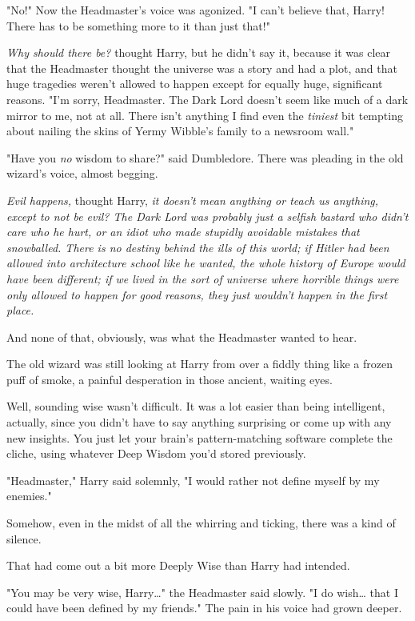 "No!" Now the Headmaster's voice was agonized. "I can't believe that, Harry!
There has to be something more to it than just that!"

\emph{Why should there be?} thought Harry, but he didn't say it, because it was
clear that the Headmaster thought the universe was a story and had a plot, and
that huge tragedies weren't allowed to happen except for equally huge,
significant reasons. "I'm sorry, Headmaster. The Dark Lord doesn't seem like
much of a dark mirror to me, not at all. There isn't anything I find even the
\emph{tiniest} bit tempting about nailing the skins of Yermy Wibble's family to
a newsroom wall."

"Have you \emph{no} wisdom to share?" said Dumbledore. There was pleading in
the old wizard's voice, almost begging.

\emph{Evil happens,} thought Harry, \emph{it doesn't mean anything or teach us
anything, except to not be evil? The Dark Lord was probably just a selfish
bastard who didn't care who he hurt, or an idiot who made stupidly avoidable
mistakes that snowballed. There is no destiny behind the ills of this world; if
Hitler had been allowed into architecture school like he wanted, the whole
history of Europe would have been different; if we lived in the sort of
universe where horrible things were only allowed to happen for good reasons,
they just wouldn't happen in the first place.}

And none of that, obviously, was what the Headmaster wanted to hear.

The old wizard was still looking at Harry from over a fiddly thing like a
frozen puff of smoke, a painful desperation in those ancient, waiting eyes.

Well, sounding wise wasn't difficult. It was a lot easier than being
intelligent, actually, since you didn't have to say anything surprising or come
up with any new insights. You just let your brain's pattern-matching software
complete the cliche, using whatever Deep Wisdom you'd stored previously.

"Headmaster," Harry said solemnly, "I would rather not define myself by my
enemies."

Somehow, even in the midst of all the whirring and ticking, there was a kind of
silence.

That had come out a bit more Deeply Wise than Harry had intended.

"You may be very wise, Harry{\ldots}" the Headmaster said slowly. "I do
wish{\ldots} that I could have been defined by my friends." The pain in his
voice had grown deeper.

